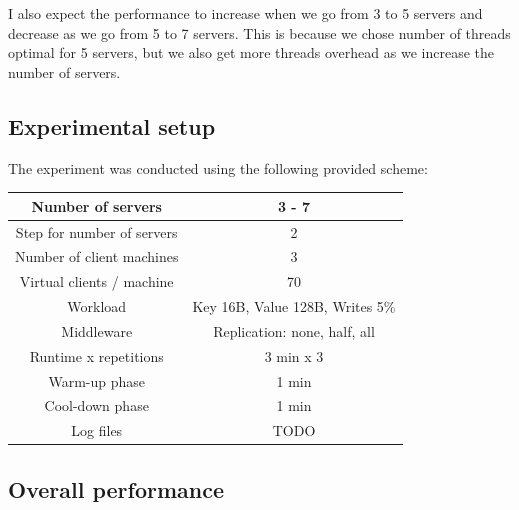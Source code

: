 \documentclass[11pt]{article}
\begin{document}
I also expect the performance to increase when we go from 3 to 5 servers and decrease as we go from 5 to 7 servers. This is because we chose number of threads optimal for 5 servers, but we also get more threads overhead as we increase the number of servers.

\subsection{Experimental setup}

The experiment was conducted using the following provided scheme:

\small{
\smallskip
\begin{tabular}{|c|c|}
\hline Number of servers & 3 - 7 \\ 
\hline Step for number of servers & 2 \\
\hline Number of client machines & 3 \\ 
\hline Virtual clients / machine &  70 \\ 
\hline Workload & Key 16B, Value 128B, Writes 5\% \\
\hline Middleware & Replication: none, half, all \\ 
\hline Runtime x repetitions & 3 min x 3 \\
\hline Warm-up phase & 1 min \\
\hline Cool-down phase & 1 min \\
\hline Log files & TODO \\
\hline 
\end{tabular} }
\medskip

\subsection{Overall performance}
\label{sec:replication-overall}
\end{document}
